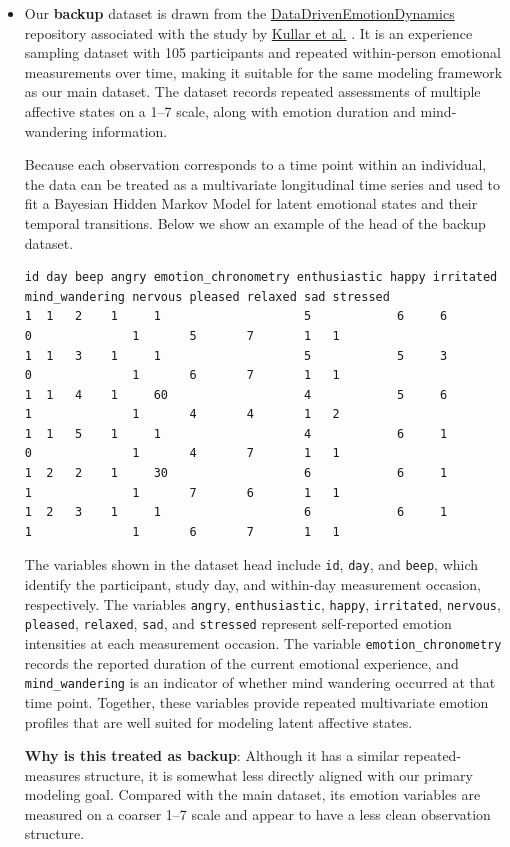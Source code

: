 \documentclass[a4paper,11pt]{article}
\begin{document}
\begin{itemize}
\item Our \textbf{backup} dataset is drawn from the \href{https://github.com/mkullar/DataDrivenEmotionDynamics/tree/main}{DataDrivenEmotionDynamics} repository associated with the study by \href{https://psycnet.apa.org/fulltext/2023-75204-001.html}{Kullar et al.} \cite{Kullar2024}. It is an experience sampling dataset with 105 participants and repeated within-person emotional measurements over time, making it suitable for the same modeling framework as our main dataset. The dataset records repeated assessments of multiple affective states on a 1--7 scale, along with emotion duration and mind-wandering information. 
 
Because each observation corresponds to a time point within an individual, the data can be treated as a multivariate longitudinal time series and used to fit a Bayesian Hidden Markov Model for latent emotional states and their temporal transitions. Below we show an example of the head of the backup dataset.

{\scriptsize
\begin{verbatim}
id day beep angry emotion_chronometry enthusiastic happy irritated mind_wandering nervous pleased relaxed sad stressed
1  1   2    1     1                    5            6     6         0              1       5       7       1   1
1  1   3    1     1                    5            5     3         0              1       6       7       1   1
1  1   4    1     60                   4            5     6         1              1       4       4       1   2
1  1   5    1     1                    4            6     1         0              1       4       7       1   1
1  2   2    1     30                   6            6     1         1              1       7       6       1   1
1  2   3    1     1                    6            6     1         1              1       6       7       1   1
\end{verbatim}
}

The variables shown in the dataset head include \texttt{id}, \texttt{day}, and \texttt{beep}, which identify the participant, study day, and within-day measurement occasion, respectively. The variables \texttt{angry}, \texttt{enthusiastic}, \texttt{happy}, \texttt{irritated}, \texttt{nervous}, \texttt{pleased}, \texttt{relaxed}, \texttt{sad}, and \texttt{stressed} represent self-reported emotion intensities at each measurement occasion. The variable \texttt{emotion\_chronometry} records the reported duration of the current emotional experience, and \texttt{mind\_wandering} is an indicator of whether mind wandering occurred at that time point. Together, these variables provide repeated multivariate emotion profiles that are well suited for modeling latent affective states.

\textbf{Why is this treated as backup}: Although it has a similar repeated-measures structure, it is somewhat less directly aligned with our primary modeling goal. Compared with the main dataset, its emotion variables are measured on a coarser 1--7 scale and appear to have a less clean observation structure.



\end{itemize}
\end{document}
